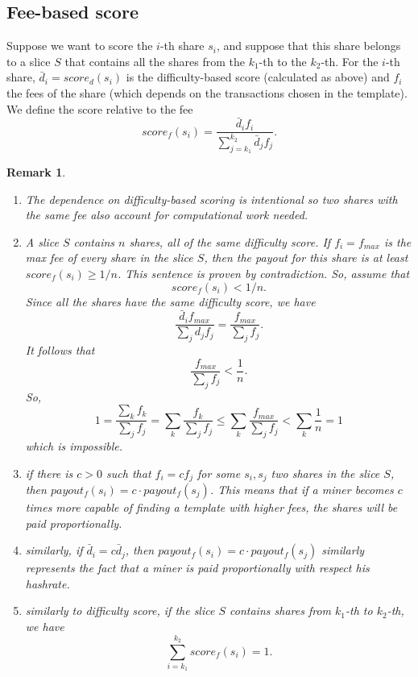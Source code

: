 \documentclass[11pt]{article}
\newtheorem{remark}{Remark}[subsection]
\begin{document}
\subsection{Fee-based score}
Suppose we want to score the $i$-th share $s_i$, and suppose that this share belongs to a slice $S$ that contains all the shares from the $k_1$-th to the $k_2$-th.
For the $i$-th share, $\bar d_i = score_d(s_i)$ is the difficulty-based score (calculated as above) and $f_i$ the fees of the share (which depends on the transactions chosen in the template). We define the score relative to the fee
\[
	score_f(s_i) = \frac{\bar d_if_i}{\sum_{j=k_1}^{k_2}\bar d_j f_j}.
\]
\begin{remark}\label{properties-diff-based-score}
	\begin{enumerate}
		\item The dependence on difficulty-based scoring is intentional so two shares with the same fee also account for computational work needed.
		\item A slice $S$ contains $n$ shares, all of the same difficulty score. If $f_i = f_{max}$ is the max fee of every share in the slice $S$, then the payout for this share is at least $score_f(s_i) \ge 1/n$. This sentence is proven by contradiction. So, assume that
		      \[score_f(s_i) < 1/n.\]
		      Since all the shares have the same difficulty score, we have
		      \[\frac{\bar d_if_{max}}{\sum_j d_j f_j} = \frac{f_{max}}{\sum_j f_j}.\]It follows that
		      \[ \frac{f_{max}}{\sum_j f_j} <\frac{1} {n}.\]
		      So,
		      \[ 1 = \frac{\sum_k f_k}{\sum_j f_j} = \sum_k \frac {f_k}{\sum_j f_j} \le \sum_k \frac{f_{max}}{\sum_j f_j}<\sum_k\frac{1}{n} = 1\]
		      which is impossible.
		\item if there is $c>0$ such that $f_i = cf_j$ for some $s_i, s_j$ two shares in the slice $S$, then $payout_f(s_i) = c \cdot payout_f(s_j)$. This means that if a miner becomes $c$ times more capable of finding a template with higher fees, the shares will be paid proportionally.
		\item similarly, if $\bar d_i = c \bar d_j$, then $payout_f(s_i) = c \cdot payout_f(s_j)$ similarly represents the fact that a miner is paid proportionally with respect his hashrate.
		\item similarly to difficulty score, if the slice $S$ contains shares from $k_1$-th to $k_2$-th, we have \[\sum_{i=k_1}^{k_2} score_f(s_i) = 1. \] \label{addstoone}
	\end{enumerate}

\end{remark}
\end{document}
